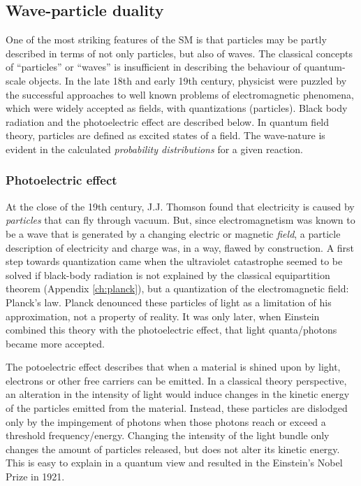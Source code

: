 \subsection{Wave-particle duality}
One of the most striking features of the SM is that particles may be partly described in terms of not only particles, but also of waves. The classical concepts of ``particles'' or ``waves'' is insufficient in describing the behaviour of quantum-scale objects. In the late 18th and early 19th century, physicist were puzzled by the successful approaches to well known problems of electromagnetic phenomena, which were widely accepted as fields, with quantizations (particles). Black body radiation and the photoelectric effect are described below. In quantum field theory, particles are defined as excited states of a field. The wave-nature is evident in the calculated \textit{probability distributions} for a given reaction.

\subsubsection{Photoelectric effect}
At the close of the 19th century, J.J. Thomson found that electricity is caused by \textit{particles} that can fly through vacuum. But, since electromagnetism was known to be a wave that is generated by a changing electric or magnetic \textit{field}, a particle description of electricity and charge was, in a way, flawed by construction. 
A first step towards quantization came when the ultraviolet catastrophe seemed to be solved if black-body radiation is not explained by the classical equipartition theorem (Appendix \ref{ch:planck}), but a quantization of the electromagnetic field: Planck's law. Planck denounced these particles of light as a limitation of his approximation, not a property of reality. It was only later, when Einstein combined this theory with the photoelectric effect, that light quanta/photons became more accepted.

The potoelectric effect describes that when a material is shined upon by light, electrons or other free carriers can be emitted. In a classical theory perspective, an alteration in the intensity of light would induce changes in the kinetic energy of the particles emitted from the material. Instead, these particles are dislodged only by the impingement of photons when those photons reach or exceed a threshold frequency/energy. Changing the intensity of the light bundle only changes the amount of particles released, but does not alter its kinetic energy. This is easy to explain in a quantum view and resulted in the Einstein's Nobel Prize in 1921.


